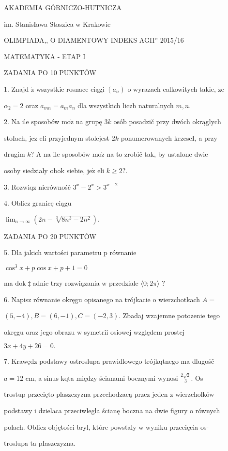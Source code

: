 \documentclass[a4paper,12pt]{article}
\begin{document}
AKADEMIA GÓRNICZO-HUTNICZA

im. StanisIawa Staszica w Krakowie

OLIMPIADA,, O DIAMENTOWY INDEKS AGH'' 2015/16

MATEMATYKA - ETAP I

ZADANIA PO 10 PUNKTÓW

1. Znajd $\acute{\mathrm{z}}$ wszystkie rosnace ciągi $(a_{n})$ o wyrazach calkowitych takie, $\dot{\mathrm{z}}\mathrm{e}$

$\alpha_{2}=2$ oraz $a_{mn}=a_{m}a_{n}$ dla wszystkich liczb naturalnych $m, n.$

2. Na ile sposobów $\mathrm{m}\mathrm{o}\dot{\mathrm{z}}$ na grupę $3k$ osób posadzič przy dwóch okrąglych

stoIach, $\mathrm{j}\mathrm{e}\dot{\mathrm{z}}$ eli przyjednym stolejest $2k$ ponumerowanych krzeseI, a przy

drugim $k$? A na ile sposobów $\mathrm{m}\mathrm{o}\dot{\mathrm{z}}$ na to zrobič tak, by ustalone dwie

osoby siedzialy obok siebie, $\mathrm{j}\mathrm{e}\dot{\mathrm{z}}$ eli $k\geq 2?.$

3. Rozwiqz nierównośč $3^{x}-2^{x}>3^{x-2}$

4. Oblicz granicę ciągu

$\displaystyle \lim_{n\rightarrow\infty}(2n-\sqrt[3]{8n^{3}-2n^{2}}).$

ZADANIA PO 20 PUNKTÓW

5. Dla jakich wartości parametru p równanie

$\cos^{3}x+p\cos x+p+1=0$

ma $\mathrm{d}\mathrm{o}\mathrm{k}\ddagger$adnie trzy rozwiązania w przedziale $\langle 0;2\pi\rangle$ ?

6. Napisz równanie okręgu opisanego na trójkacie o wierzchotkach $A =$

$(5,-4), B = (6,-1), C= (-2,3)$. Zbadaj wzajemne potozenie tego

okręgu oraz jego obrazu w symetrii osiowej względem prostej

$3x+4y+26=0.$

7. Krawędz$\acute{}$ podstawy ostroslupa prawidlowego trójkqtnego ma dlugośč

$a= 12$ cm, a sinus kqta między ścianami bocznymi wynosi $\displaystyle \frac{2\sqrt{2}}{3}$. Os-

trostup przecięto plaszczyzna przechodzacą przez jeden z wierzcholków

podstawy i dzielaca przeciwlegla ścianę boczna na dwie figury o równych

polach. Oblicz objętości bryl, które powstaly w wyniku przecięcia os-

troslupa ta pIaszczyzna.
\end{document}
